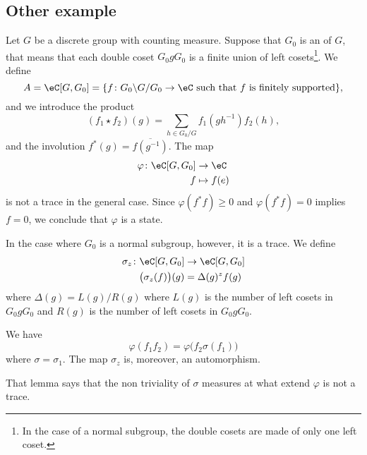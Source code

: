 					\subsection{Other example}

Let $G$ be a discrete group with counting measure. Suppose that $G_0$ is an  of $G$, that means that each double coset $G_0gG_0$ is a finite union of left cosets\footnote{In the case of a normal subgroup, the double cosets are made of only one left coset.}. We define
\begin{equation}
    A=\eC[G,G_0]=\{ f\colon G_0\backslash G/G_0\to \eC\text{ such that }f \text{ is finitely supported} \},
\end{equation}
and we introduce the product
\begin{equation}
	(f_1\star f_2)(g)=\sum_{h\in G_0/G}f_1(gh^{-1})f_2(h),
\end{equation}
and the involution $f^*(g)=\overline{ f(g^{-1}) }$.  The map
\begin{equation}
\begin{aligned}
 \varphi\colon \eC[G,G_0]&\to \eC \\ 
   f&\mapsto f(e) 
\end{aligned}
\end{equation}
is not a trace in the general case. Since $\varphi(f^*f)\geq0$ and $\varphi(f^*f)=0$ implies $f=0$, we conclude that $\varphi$ is a state.

In the case where $G_0$ is a normal subgroup, however, it is a trace. We define
\begin{equation}
\begin{aligned}
 \sigma_z\colon \eC[G,G_0]&\to \eC[G,G_0] \\ 
   \big( \sigma_z(f) \big)(g)& = \Delta(g)^zf(g) 
\end{aligned}
\end{equation}
where $\Delta(g)=L(g)/R(g)$ where $L(g)$ is the number of left cosets in $G_0gG_0$ and $R(g)$ is the number of left cosets in $G_0gG_0$.

\begin{lemma}
	We have
	\begin{equation}
		\varphi(f_1f_2)=\varphi\big( f_2\sigma(f_1) \big)
	\end{equation}
	where $\sigma=\sigma_1$. The map $\sigma_z$ is, moreover, an automorphism.
\end{lemma}
That lemma says that the non triviality of $\sigma$ measures at what extend $\varphi$ is not a trace.

